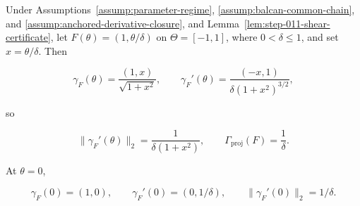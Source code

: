 \begin{lemma}
\label{lem:step-011-projective-speed}

Under Assumptions~\ref{assump:parameter-regime},
\ref{assump:balcan-common-chain}, and
\ref{assump:anchored-derivative-closure}, and
Lemma~\ref{lem:step-011-shear-certificate}, let
\(F(\theta)=(1,\theta/\delta)\) on \(\Theta=[-1,1]\), where
\(0<\delta\leq1\), and set \(x=\theta/\delta\). Then

\begin{equation}
\label{eq:appendix-display-343}
\gamma_F(\theta)=\frac{(1,x)}{\sqrt{1+x^2}},
\qquad
\gamma_F'(\theta)
=\frac{(-x,1)}{\delta(1+x^2)^{3/2}},
\end{equation}

so

\begin{equation}
\label{eq:appendix-display-344}
\lVert\gamma_F'(\theta)\rVert_2
=\frac{1}{\delta(1+x^2)},
\qquad
\Gamma_{\mathrm{proj}}(F)=\frac1\delta.
\end{equation}

At \(\theta=0\),

\begin{equation}
\label{eq:appendix-display-345}
\gamma_F(0)=(1,0),
\qquad
\gamma_F'(0)=(0,1/\delta),
\qquad
\lVert\gamma_F'(0)\rVert_2=1/\delta.
\end{equation}


\end{lemma}

